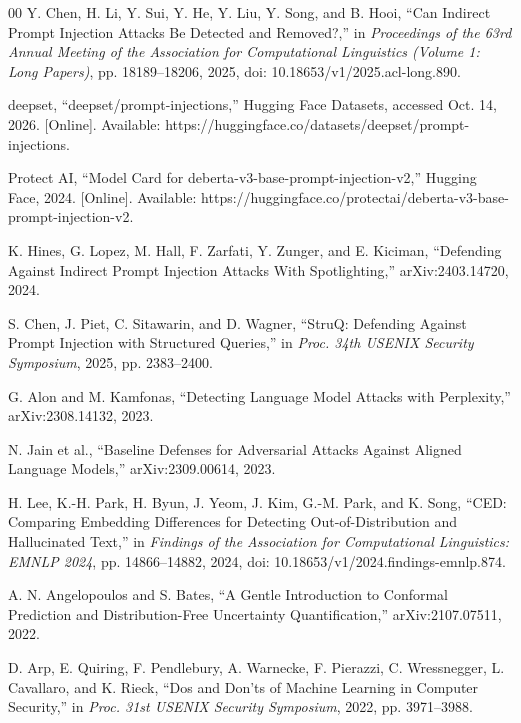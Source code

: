 \begin{thebibliography}{00}
 Y. Chen, H. Li, Y. Sui, Y. He, Y. Liu, Y. Song, and B. Hooi, ``Can Indirect Prompt Injection Attacks Be Detected and Removed?,'' in \textit{Proceedings of the 63rd Annual Meeting of the Association for Computational Linguistics (Volume 1: Long Papers)}, pp. 18189--18206, 2025, doi: 10.18653/v1/2025.acl-long.890.

 deepset, ``deepset/prompt-injections,'' Hugging Face Datasets, accessed Oct. 14, 2026. [Online]. Available: https://huggingface.co/datasets/deepset/prompt-injections.

 Protect AI, ``Model Card for deberta-v3-base-prompt-injection-v2,'' Hugging Face, 2024. [Online]. Available: https://huggingface.co/protectai/deberta-v3-base-prompt-injection-v2.

 K. Hines, G. Lopez, M. Hall, F. Zarfati, Y. Zunger, and E. Kiciman, ``Defending Against Indirect Prompt Injection Attacks With Spotlighting,'' arXiv:2403.14720, 2024.

 S. Chen, J. Piet, C. Sitawarin, and D. Wagner, ``StruQ: Defending Against Prompt Injection with Structured Queries,'' in \textit{Proc. 34th USENIX Security Symposium}, 2025, pp. 2383--2400.

 G. Alon and M. Kamfonas, ``Detecting Language Model Attacks with Perplexity,'' arXiv:2308.14132, 2023.

 N. Jain et al., ``Baseline Defenses for Adversarial Attacks Against Aligned Language Models,'' arXiv:2309.00614, 2023.

 H. Lee, K.-H. Park, H. Byun, J. Yeom, J. Kim, G.-M. Park, and K. Song, ``CED: Comparing Embedding Differences for Detecting Out-of-Distribution and Hallucinated Text,'' in \textit{Findings of the Association for Computational Linguistics: EMNLP 2024}, pp. 14866--14882, 2024, doi: 10.18653/v1/2024.findings-emnlp.874.

 A. N. Angelopoulos and S. Bates, ``A Gentle Introduction to Conformal Prediction and Distribution-Free Uncertainty Quantification,'' arXiv:2107.07511, 2022.

 D. Arp, E. Quiring, F. Pendlebury, A. Warnecke, F. Pierazzi, C. Wressnegger, L. Cavallaro, and K. Rieck, ``Dos and Don'ts of Machine Learning in Computer Security,'' in \textit{Proc. 31st USENIX Security Symposium}, 2022, pp. 3971--3988.


\end{thebibliography}
